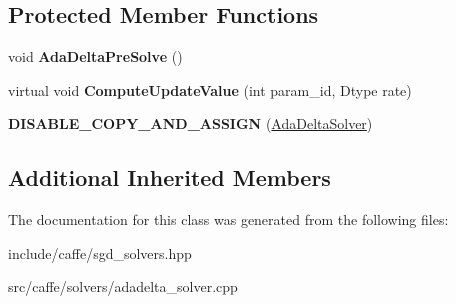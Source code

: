 \subsection*{Protected Member Functions}
\begin{DoxyCompactItemize}
\item 
void {\bfseries Ada\+Delta\+Pre\+Solve} ()\hypertarget{classcaffe_1_1AdaDeltaSolver_a5aae9f8d57714dd41e92c7a285d31d0a}{}\label{classcaffe_1_1AdaDeltaSolver_a5aae9f8d57714dd41e92c7a285d31d0a}

\item 
virtual void {\bfseries Compute\+Update\+Value} (int param\+\_\+id, Dtype rate)\hypertarget{classcaffe_1_1AdaDeltaSolver_aa3b649a03988cab462d411e26784f209}{}\label{classcaffe_1_1AdaDeltaSolver_aa3b649a03988cab462d411e26784f209}

\item 
{\bfseries D\+I\+S\+A\+B\+L\+E\+\_\+\+C\+O\+P\+Y\+\_\+\+A\+N\+D\+\_\+\+A\+S\+S\+I\+GN} (\hyperlink{classcaffe_1_1AdaDeltaSolver}{Ada\+Delta\+Solver})\hypertarget{classcaffe_1_1AdaDeltaSolver_ae1097650f9ae280b649d3b116c26152f}{}\label{classcaffe_1_1AdaDeltaSolver_ae1097650f9ae280b649d3b116c26152f}

\end{DoxyCompactItemize}
\subsection*{Additional Inherited Members}


The documentation for this class was generated from the following files\+:\begin{DoxyCompactItemize}
\item 
include/caffe/sgd\+\_\+solvers.\+hpp\item 
src/caffe/solvers/adadelta\+\_\+solver.\+cpp\end{DoxyCompactItemize}
